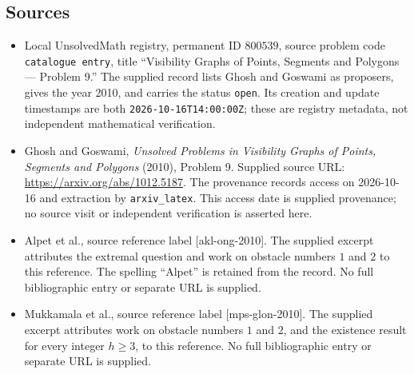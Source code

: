 \documentclass[11pt]{article}
\begin{document}
\subsection{Sources}
\begin{itemize}
\item Local UnsolvedMath registry, permanent ID \(800539\), source problem code \texttt{catalogue entry}, title ``Visibility Graphs of Points, Segments and Polygons --- Problem 9.'' The supplied record lists Ghosh and Goswami as proposers, gives the year 2010, and carries the status \texttt{open}. Its creation and update timestamps are both \texttt{2026-10-16T14:00:00Z}; these are registry metadata, not independent mathematical verification.
\item Ghosh and Goswami, \emph{Unsolved Problems in Visibility Graphs of Points, Segments and Polygons} (2010), Problem 9. Supplied source URL: \url{https://arxiv.org/abs/1012.5187}. The provenance records access on 2026-10-16 and extraction by \texttt{arxiv\_latex}. This access date is supplied provenance; no source visit or independent verification is asserted here.
\item Alpet et al., source reference label [akl-ong-2010]. The supplied excerpt attributes the extremal question and work on obstacle numbers \(1\) and \(2\) to this reference. The spelling ``Alpet'' is retained from the record. No full bibliographic entry or separate URL is supplied.
\item Mukkamala et al., source reference label [mps-glon-2010]. The supplied excerpt attributes work on obstacle numbers \(1\) and \(2\), and the existence result for every integer \(h\geq 3\), to this reference. No full bibliographic entry or separate URL is supplied.
\end{itemize}
\end{document}
